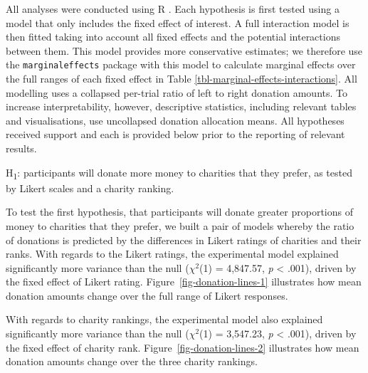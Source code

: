\documentclass[
  authoryear,
  preprint,
  3p]{elsarticle}
\begin{document}
All analyses were conducted using R \citep[version 4.5.3,][]{r_core}.
Each hypothesis is first tested using a model that only includes the
fixed effect of interest. A full interaction model is then fitted taking
into account all fixed effects and the potential interactions between
them. This model provides more conservative estimates; we therefore use
the \texttt{marginaleffects} package \citep[version
1.0.0,][]{arel-bundock_2024} with this model to calculate marginal
effects over the full ranges of each fixed effect in Table
\ref{tbl-marginal-effects-interactions}. All modelling uses a collapsed
per-trial ratio of left to right donation amounts. To increase
interpretability, however, descriptive statistics, including relevant
tables and visualisations, use uncollapsed donation allocation means.
All hypotheses received support and each is provided below prior to the
reporting of relevant results.


\hspace{0pt}
\begin{tcolorbox}[colback=nicegreen, colframe=gray!50, boxrule=0.5pt]
  H\textsubscript{1}: participants will donate more money to charities that they prefer, as tested by Likert scales and a charity ranking.
\end{tcolorbox}
\hspace{0pt}

To test the first hypothesis, that participants will donate greater
proportions of money to charities that they prefer, we built a pair of
models whereby the ratio of donations is predicted by the differences in
Likert ratings of charities and their ranks. With regards to the Likert
ratings, the experimental model explained significantly more variance
than the null (\(\chi^2\)(1) = 4,847.57, \emph{p} \textless{} .001),
driven by the fixed effect of Likert rating.
Figure~\ref{fig-donation-lines-1} illustrates how mean donation amounts
change over the full range of Likert responses.

With regards to charity rankings, the experimental model also explained
significantly more variance than the null (\(\chi^2\)(1) = 3,547.23,
\emph{p} \textless{} .001), driven by the fixed effect of charity rank.
Figure~\ref{fig-donation-lines-2} illustrates how mean donation amounts
change over the three charity rankings.
\end{document}
